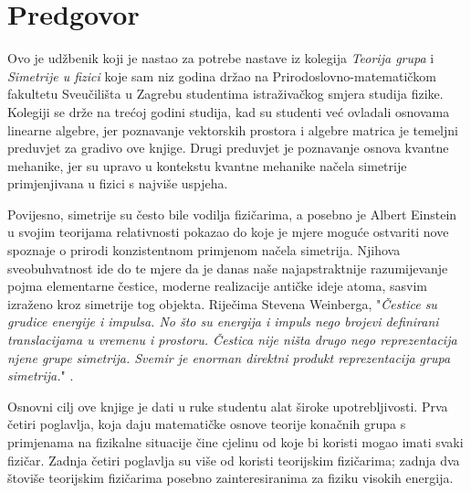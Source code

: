 

\thispagestyle{empty}

\hspace*{10ex}
\section*{Predgovor}

Ovo je udžbenik koji je nastao za potrebe nastave iz 
kolegija \emph{Teorija grupa} i \emph{Simetrije u fizici} koje
sam niz godina držao na Prirodoslovno-matematičkom fakultetu
Sveučilišta u Zagrebu studentima istraživačkog smjera studija fizike.
Kolegiji se drže na trećoj godini studija, kad
su studenti već ovladali osnovama linearne algebre, jer poznavanje
vektorskih prostora i algebre matrica je temeljni preduvjet za
gradivo ove knjige. Drugi preduvjet je poznavanje osnova kvantne
mehanike, jer su upravo u kontekstu kvantne mehanike načela simetrije
primjenjivana u fizici s najviše uspjeha.


Povijesno, simetrije su često bile vodilja fizičarima, a posebno
je Albert Einstein u svojim teorijama relativnosti pokazao do koje je
mjere moguće ostvariti nove spoznaje o prirodi konzistentnom primjenom
načela simetrija.
Njihova sveobuhvatnost ide do te mjere da je danas naše najapstraktnije
razumijevanje pojma elementarne čestice, moderne realizacije antičke ideje atoma, 
sasvim izraženo kroz simetrije tog objekta. Riječima 
Stevena Weinberga, "\emph{Čestice su grudice energije i impulsa. No što su
energija i impuls nego brojevi definirani translacijama u
vremenu i prostoru. Čestica nije ništa drugo nego
reprezentacija njene grupe simetrija. Svemir je enorman direktni produkt 
reprezentacija grupa simetrija.}" \cite{Crease:1996}.

Osnovni cilj ove knjige je dati u ruke studentu alat široke
upotrebljivosti. Prva četiri poglavlja, koja daju matematičke
osnove teorije konačnih grupa s primjenama na fizikalne situacije
čine cjelinu od koje bi koristi mogao imati svaki fizičar. 
Zadnja četiri poglavlja su više od koristi teorijskim fizičarima;
zadnja dva štoviše teorijskim fizičarima posebno zainteresiranima za
fiziku visokih energija.

\begin{flushleft}
\end{flushleft}
